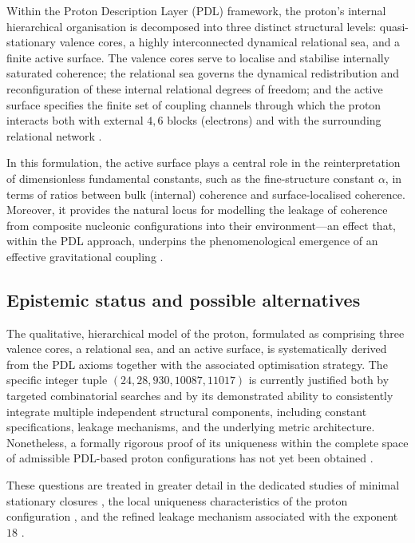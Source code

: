 \documentclass{article}
\begin{document}
Within the Proton Description Layer (PDL) framework, the proton’s internal hierarchical organisation is decomposed into three distinct structural levels: quasi-stationary valence cores, a highly interconnected dynamical relational sea, and a finite active surface. The valence cores serve to localise and stabilise internally saturated coherence; the relational sea governs the dynamical redistribution and reconfiguration of these internal relational degrees of freedom; and the active surface specifies the finite set of coupling channels through which the proton interacts both with external \(4,6\) blocks (electrons) and with the surrounding relational network
\citep{PDL_Main_2026,Born_Golden_v2_2026}.

In this formulation, the active surface plays a central role in the reinterpretation of dimensionless fundamental constants, such as the fine-structure constant \(\alpha\), in terms of ratios between bulk (internal) coherence and surface-localised coherence. Moreover, it provides the natural locus for modelling the leakage of coherence from composite nucleonic configurations into their environment—an effect that, within the PDL approach, underpins the phenomenological emergence of an effective gravitational coupling
\citep{Alpha_PDL_v2_2026,Exponent_18_PDL_2026}.

\subsection{Epistemic status and possible alternatives}
\label{subsec:proton_status}

The qualitative, hierarchical model of the proton, formulated as comprising three valence cores, a relational sea, and an active surface, is systematically derived from the PDL axioms together with the associated optimisation strategy. The specific integer tuple \((24,28,930,10087,11017)\) is currently justified both by targeted combinatorial searches and by its demonstrated ability to consistently integrate multiple independent structural components, including constant specifications, leakage mechanisms, and the underlying metric architecture. Nonetheless, a formally rigorous proof of its uniqueness within the complete space of admissible PDL-based proton configurations has not yet been obtained
\citep{Combinatorial_Proton_v2_2026,PDL_position}.

These questions are treated in greater detail in the dedicated studies of minimal stationary closures \citep{Minimal_Stationary_Closures_2026}, the local uniqueness characteristics of the proton configuration \citep{Proton_Local_Uniqueness_2026,Combinatorial_Proton_v2_2026}, and the refined leakage mechanism associated with the exponent \(18\) \citep{Coherence_Leakage_18_2026,Exponent_18_PDL_2026}.
\end{document}
